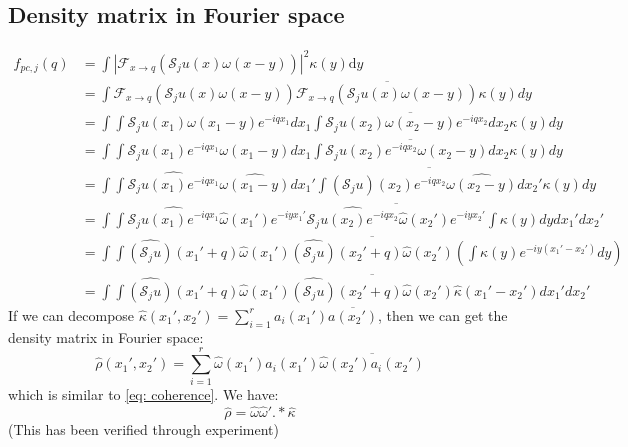 \documentclass{article}
\numberwithin{equation}{section}
\begin{document}
 \subsection{Density matrix in Fourier space}
  \begin{equation}
  \begin{aligned}
  f_{p c, j}(q) &= \int\left|\mathcal{F}_{x \rightarrow q}\left(\mathcal{S}_{j} u(x) \omega(x-y)\right)\right|^{2} \kappa(y) \mathrm{d} y\\
  &= \int \mathcal{F}_{x \rightarrow q}\left(\mathcal{S}_{j} u(x) \omega(x-y)\right) \overline{ \mathcal{F}_{x \rightarrow q}\left(\mathcal{S}_{j} u(x) \omega(x-y)\right) }  \kappa(y)     dy\\
   &= \int \int \mathcal{S}_{j} u(x_1) \omega(x_1-y) e^{-iqx_1} dx_1 \overline{ \int \mathcal{S}_{j} u(x_2) \omega(x_2-y) e^{-iqx_2}dx_2 }  \kappa(y)   dy \\
   &= \int \int \mathcal{S}_{j} u(x_1)e^{-iqx_1} \omega(x_1-y)  dx_1 \overline{ \int \mathcal{S}_{j} u(x_2)e^{-iqx_2} \omega(x_2-y) dx_2 }  \kappa(y)   dy\\
   &= \int \int \widehat{\mathcal{S}_{j} u(x_1)e^{-iqx_1}} \widehat{\omega(x_1-y)}  dx_1' \overline{ \int \widehat{(\mathcal{S}_{j}u)(x_2) e^{-iqx_2} }  \widehat{\omega(x_2-y)} dx_2' } \kappa(y)   dy\\
  & = \int\int  
   \widehat{\mathcal{S}_{j} u(x_1)e^{-iqx_1}} \widehat{\omega}(x_1')e^{-iyx_1'}  \overline{ \widehat{\mathcal{S}_{j} u(x_2)e^{-iqx_2}} \widehat{\omega}(x_2')e^{-iyx_2'} }   \int   \kappa(y)   dy
  dx_1' dx_2' \\
  & =  \int\int  
  \widehat{(\mathcal{S}_{j}u)}(x_1' + q) \widehat{\omega}(x_1')   \overline{ \widehat{(\mathcal{S}_{j}u)}(x_2' + q) \widehat{\omega}(x_2') }   (\int   \kappa(y)e^{-iy(x_1'-x_2')}  dy ) \\
  & = \int\int  
  \widehat{(\mathcal{S}_{j}u)}(x_1' + q) \widehat{\omega}(x_1')   \overline{ \widehat{(\mathcal{S}_{j}u)}(x_2' + q) \widehat{\omega}(x_2') }    \hat{\kappa}(x_1'-x_2')  
dx_1' dx_2'
  \end{aligned}
  \end{equation}
  If we can decompose $\hat{\kappa}(x_1',x_2') = \sum_{i=1}^r a_i(x_1') \overline{a(x_2')}$, then we can get the density matrix in Fourier space:
  $$
  \hat{\rho}(x_1',x_2') = \sum_{i=1}^{r} \hat{\omega}(x_1')a_i(x_1') \overline{\hat{\omega}(x_2')a_i(x_2')}
  $$
  which is similar to \ref{eq: coherence}. We have:
  $$
   \hat{\rho}  = \hat{\omega}\hat{\omega}' .* \hat{\kappa}
  $$
  (This has been verified through experiment)
  
\end{document}
